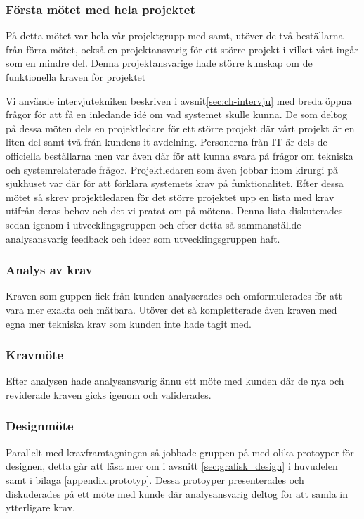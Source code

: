 \subsubsection{Första mötet med hela projektet}
På detta mötet var hela vår projektgrupp med samt, utöver de två beställarna från förra mötet, också en projektansvarig för ett större projekt i vilket vårt ingår som en mindre del. Denna projektansvarige hade större kunskap om de funktionella kraven för projektet 

Vi använde intervjutekniken beskriven i avsnit\ref{sec:ch-intervju} med breda öppna frågor för att få en inledande idé om vad systemet skulle kunna. De som deltog på dessa möten dels en projektledare för ett större projekt där vårt projekt är en liten del samt två från kundens it-avdelning. Personerna från IT är dels de officiella beställarna men var även där för att kunna svara på frågor om tekniska och systemrelaterade frågor. Projektledaren som även jobbar inom kirurgi på sjukhuset var där för att förklara systemets krav på funktionalitet. Efter dessa mötet så skrev projektledaren för det större projektet upp en lista med krav utifrån deras behov och det vi pratat om på mötena. Denna lista diskuterades sedan igenom i utvecklingsgruppen och efter detta så sammanställde analysansvarig feedback och ideer som utvecklingsgruppen haft.

\subsubsection{Analys av krav}
Kraven som guppen fick från kunden analyserades och omformulerades för att vara mer exakta och mätbara. Utöver det så kompletterade även kraven med egna mer tekniska krav som kunden inte hade tagit med.

\subsubsection{Kravmöte}
Efter analysen hade analysansvarig ännu ett möte med kunden där de nya och reviderade kraven gicks igenom och validerades.

\subsubsection{Designmöte}
Parallelt med kravframtagningen så jobbade gruppen på med olika protoyper för designen, detta går att läsa mer om i avsnitt \ref{sec:grafisk_design} i huvudelen samt i bilaga \ref{appendix:prototyp}.
Dessa protoyper presenterades och diskuderades på ett möte med kunde där analysansvarig deltog för att samla in ytterligare krav.

